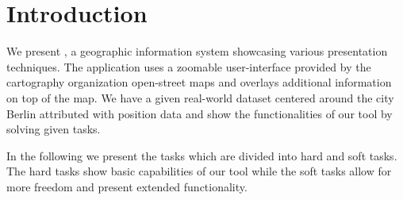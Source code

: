 \section*{Introduction}
We present , a geographic information system
showcasing various presentation techniques.
The application uses a zoomable user-interface provided
by the cartography organization open-street maps and overlays
additional information on top of the map.
We have a given real-world dataset centered around the city Berlin
attributed with position data and show the functionalities of
our tool by solving given tasks.

In the following we present the tasks which are divided into
hard and soft tasks. The hard tasks show basic capabilities
of our tool while the soft tasks allow for more freedom
and present extended functionality.

\begin{figure}[h]
\centering
\end{figure}
